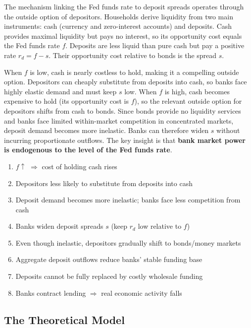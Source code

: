 \documentclass[12pt,a4paper]{article}
\begin{document}
The mechanism linking the Fed funds rate to deposit spreads operates through
the outside option of depositors. Households derive liquidity from two main
instruments: cash (currency and zero-interest accounts) and deposits. Cash
provides maximal liquidity but pays no interest, so its opportunity cost equals
the Fed funds rate $f$. Deposits are less liquid than pure cash but pay a
positive rate $r_d = f - s$. Their opportunity cost relative to bonds is the
spread $s$.

When $f$ is low, cash is nearly costless to hold, making it a compelling
outside option. Depositors can cheaply substitute from deposits into cash,
so banks face highly elastic demand and must keep $s$ low. When $f$ is high,
cash becomes expensive to hold (its opportunity cost is $f$), so the relevant
outside option for depositors shifts from cash to bonds. Since bonds provide
no liquidity services and banks face limited within-market competition in
concentrated markets, deposit demand becomes more inelastic. Banks can therefore
widen $s$ without incurring proportionate outflows. The key insight is that
\textbf{bank market power is endogenous to the level of the Fed funds rate}.

\begin{keybox}
\begin{enumerate}
  \item $f \uparrow$ $\Rightarrow$ cost of holding cash rises
  \item Depositors less likely to substitute from deposits into cash
  \item Deposit demand becomes more inelastic; banks face less competition from cash
  \item Banks widen deposit spreads $s$ (keep $r_d$ low relative to $f$)
  \item Even though inelastic, depositors gradually shift to bonds/money markets
  \item Aggregate deposit outflows reduce banks' stable funding base
  \item Deposits cannot be fully replaced by costly wholesale funding
  \item Banks contract lending $\Rightarrow$ real economic activity falls
\end{enumerate}
\end{keybox}

\subsection{The Theoretical Model}
\end{document}
